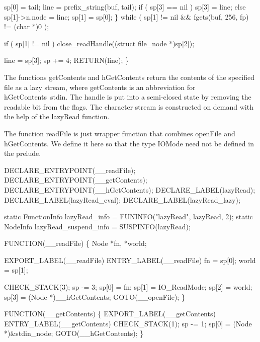         sp[0] = tail;
        line  = prefix_string(buf, tail);
        if ( sp[3] == nil )
            sp[3] = line;
        else
            sp[1]->n.node = line;
        sp[1] = sp[0];
    \} while ( sp[1] != nil && fgets(buf, 256, fp) != (char *)0 );

    if ( sp[1] != nil )
        close_readHandle((struct file_node *)sp[2]);

    line = sp[3];
    sp  += 4;
    RETURN(line);
\}

\nwendcode{}\nwdocspar
The functions {\Tt{}getContents\nwendquote} and {\Tt{}hGetContents\nwendquote} return the contents
of the specified file as a lazy stream, where {\Tt{}getContents\nwendquote} is an
abbreviation for {\Tt{}hGetContents\ stdin\nwendquote}. The handle is put into a
semi-closed state by removing the {\Tt{}readable\nwendquote} bit from the flags. The
character stream is constructed on demand with the help of the
{\Tt{}lazyRead\nwendquote} function.

The function {\Tt{}readFile\nwendquote} is just wrapper function that combines
{\Tt{}openFile\nwendquote} and {\Tt{}hGetContents\nwendquote}. We define it here so that the type
{\Tt{}IOMode\nwendquote} need not be defined in the prelude.

\nwenddocs{}\plusendmoddef\nwstartdeflinemarkup{}\nwenddeflinemarkup
DECLARE_ENTRYPOINT(__readFile);
DECLARE_ENTRYPOINT(__getContents);
DECLARE_ENTRYPOINT(__hGetContents);
DECLARE_LABEL(lazyRead);
DECLARE_LABEL(lazyRead_eval);
DECLARE_LABEL(lazyRead_lazy);

static FunctionInfo lazyRead_info         = FUNINFO("lazyRead", lazyRead, 2);
static NodeInfo     lazyRead_suspend_info = SUSPINFO(lazyRead);

FUNCTION(__readFile)
\{
    Node *fn, *world;

    EXPORT_LABEL(__readFile)
 ENTRY_LABEL(__readFile)
    fn    = sp[0];
    world = sp[1];

    CHECK_STACK(3);
    sp   -= 3;
    sp[0] = fn;
    sp[1] = IO_ReadMode;
    sp[2] = world;
    sp[3] = (Node *)__hGetContents;
    GOTO(__openFile);
\}

FUNCTION(__getContents)
\{
    EXPORT_LABEL(__getContents)
 ENTRY_LABEL(__getContents)
    CHECK_STACK(1);
    sp   -= 1;
    sp[0] = (Node *)&stdin_node;
    GOTO(__hGetContents);
\}

